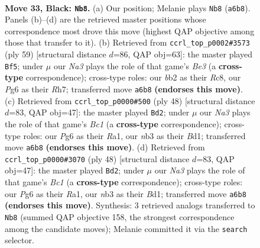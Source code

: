 \documentclass[11pt]{article}
\begin{document}
\clearpage

\begin{figure}[p]\centering
\begin{subfigure}{0.46\textwidth}\centering
\resizebox{\linewidth}{!}{%
\newchessgame
\chessboard[
  setfen={r2b2r1/1p1k1b1p/n5pP/p2pPp2/P7/1NN3P1/1B4K1/R4R2 b - - 10 33},
  showmover=false,
  pgfstyle=straightmove, color=movearrow, markmove={a6-b8}
]}
\caption{}
\end{subfigure}\hfill
\begin{subfigure}{0.46\textwidth}\centering
\resizebox{\linewidth}{!}{%
\newchessgame
\chessboard[
  setfen={2r3k1/7r/1p2b3/p1bpN2p/Pn3P2/1P2P1p1/1B1KB1P1/R6R b - - 0 30},
  showmover=false,
  pgfstyle=straightmove, color=movearrow, markmove={e6-f5}
]}
\caption{}
\end{subfigure}
\\[4pt]
\begin{subfigure}{0.46\textwidth}\centering
\resizebox{\linewidth}{!}{%
\newchessgame
\chessboard[
  setfen={r4rk1/1b3p2/1p6/4p1Pp/3nP2P/8/PP6/R1BB1RK1 w - - 3 25},
  showmover=false,
  pgfstyle=straightmove, color=movearrow, markmove={c1-d2}
]}
\caption{}
\end{subfigure}\hfill
\begin{subfigure}{0.46\textwidth}\centering
\resizebox{\linewidth}{!}{%
\newchessgame
\chessboard[
  setfen={r4rk1/1b3p2/1p6/4p1Pp/3nP2P/8/PP6/R1BB1RK1 w - - 3 25},
  showmover=false,
  pgfstyle=straightmove, color=movearrow, markmove={c1-d2}
]}
\caption{}
\end{subfigure}
\caption{\textbf{Move 33, Black: \texttt{Nb8}.} (a) Our position; Melanie plays \texttt{Nb8} (\texttt{a6b8}). Panels (b)--(d) are the retrieved master positions whose correspondence most drove this move (highest QAP objective among those that transfer to it). (b) Retrieved from \texttt{ccrl\_top\_p0002\#3573} (ply 59) [structural distance $d$=86, QAP obj=63]: the master played \texttt{Bf5}; under $\mu$ our \emph{Na3} plays the role of that game's \emph{Be3} (a \textbf{cross-type} correspondence); cross-type roles: our \emph{b}b2 as their \emph{R}c8, our \emph{P}g6 as their \emph{R}h7; transferred move \texttt{a6b8} \textbf{(endorses this move)}. (c) Retrieved from \texttt{ccrl\_top\_p0000\#500} (ply 48) [structural distance $d$=83, QAP obj=47]: the master played \texttt{Bd2}; under $\mu$ our \emph{Na3} plays the role of that game's \emph{Bc1} (a \textbf{cross-type} correspondence); cross-type roles: our \emph{P}g6 as their \emph{R}a1, our \emph{n}b3 as their \emph{B}d1; transferred move \texttt{a6b8} \textbf{(endorses this move)}. (d) Retrieved from \texttt{ccrl\_top\_p0000\#3070} (ply 48) [structural distance $d$=83, QAP obj=47]: the master played \texttt{Bd2}; under $\mu$ our \emph{Na3} plays the role of that game's \emph{Bc1} (a \textbf{cross-type} correspondence); cross-type roles: our \emph{P}g6 as their \emph{R}a1, our \emph{n}b3 as their \emph{B}d1; transferred move \texttt{a6b8} \textbf{(endorses this move)}. Synthesis: 3 retrieved analogs transferred to \texttt{Nb8} (summed QAP objective 158, the strongest correspondence among the candidate moves); Melanie committed it via the \texttt{search} selector.}
\label{fig:thought-m65}
\end{figure}
\end{document}
